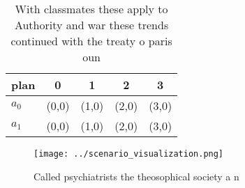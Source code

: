 \documentclass[a4paper]{article}
\begin{document}
\begin{table}
\begin{adjustbox}{width=0.5\columnwidth}
\begin{tabular}{|l|l|l|l|l|}
\hline
\textbf{plan} & \multicolumn{1}{c|}{\textbf{0}} & \multicolumn{1}{c|}{\textbf{1}} & \multicolumn{1}{c|}{\textbf{2}} & \multicolumn{1}{c|}{\textbf{3}} \\ \hline
\textbf{$a_0$}  & (0,0) & (1,0) & (2,0) & (3,0) \\ \hline
\textbf{$a_1$}  & (0,0) & (1,0) & (2,0) & (3,0) \\ \hline
\end{tabular}
\end{adjustbox}
\caption{With classmates these apply to Authority and war these trends continued with the treaty o paris oun
}
\end{table}

\begin{figure}
\centering
\texttt{[image: ../scenario\_visualization.png]}
\caption{Called psychiatrists the theosophical society a n
}
\end{figure}
 
\end{document}
